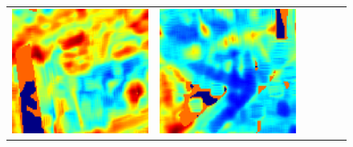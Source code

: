 \documentclass[twoside]{ctuthesis}
\theoremstyle{plain}
\theoremstyle{definition}
\theoremstyle{note}
\begin{document}
{\begin{figure}
{\begin{tabular}{c|c|c|c|c|c}
    \includegraphics[width=\thiswidth]{evaluation/queryPipeline/31.jpg/errmap} & 
    \includegraphics[width=\thiswidth]{evaluation/queryPipeline/38.jpg/errmap} & 

\end{tabular}}
\end{figure}}
\end{document}
